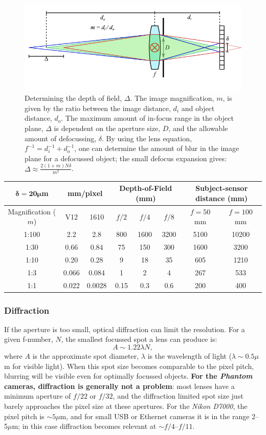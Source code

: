 \documentclass[11pt]{amsart}
\begin{document}
\begin{figure}
\includegraphics{figures/dof.pdf}
\caption{Determining the depth of field, $\Delta$.  The image magnification, $m$, is given by the ratio between the image distance, $d_i$ and object distance, $d_o$.  The maximum amount of in-focus range in the object plane, $\Delta$ is dependent on the aperture size, $D$, and the allowable amount of defocussing, $\delta$.  By using the lens equation, $f^{-1} = d_i^{-1} + d_o^{-1}$, one can determine the amount of blur in the image plane for a defocussed object; the small defocus expansion gives: $\Delta \approx \frac{2 \left(1 + m\right) N \delta}{m^2}$.}
\label{fig:dof}
\end{figure}

\begin{centering}
\begin{tabular}{c|c|c|c|c|c|c|c}
{\bf $\boldsymbol{\delta=20\mu}$m}&\multicolumn{2}{|c|}{mm/pixel}&\multicolumn{3}{|c|}{Depth-of-Field (mm)}&\multicolumn{2}{|c}{Subject-sensor distance (mm)}\\
\hline
Magnification ($m$)&V12&1610&$f/2$&$f/4$&$f/8$&$f=50$mm&$f=100$mm\\
\hline
1:100&2.2&2.8&800&1600&3200&5100&10200\\
1:30&0.66&0.84&75&150&300&1600&3200\\
1:10&0.20&0.28&9&18&35&605&1210\\
1:3&0.066&0.084&1&2&4&267&533\\
1:1&0.022&0.0028&0.15&0.3&0.6&200&400\\
\end{tabular}
\end{centering}

\subsubsection{Diffraction}
If the aperture is too small, optical diffraction can limit the resolution.
For a given f-number, $N$, the smallest focussed spot a lens can produce is:
$$
A \sim 1.22 \lambda N,
$$
where $A$ is the approximate spot diameter, $\lambda$ is the wavelength of light ($\lambda \sim0.5\mu$m for visible light).
When this spot size becomes comparable to the pixel pitch, blurring will be visible even for optimally focussed objects.
{\bf For the \emph{Phantom} cameras, diffraction is generally not a problem}: most lenses have a minimum aperture of $f/22$ or $f/32$, and the diffraction limited spot size just barely approaches the pixel size at these apertures.
For the \emph{Nikon D7000}, the pixel pitch is $\sim 5\mu$m, and for small USB or Ethernet cameras it is in the range 2--5$\mu$m; in this case diffraction becomes relevant at $\sim f/4$--$f/11$. 
\end{document}
